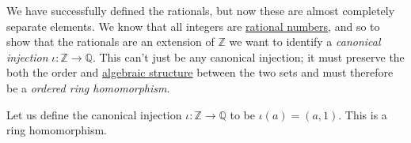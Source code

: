   We have successfully defined the rationals, but now these are almost completely separate elements. We know that all integers are \hyperref[alg-def:rational-numbers]{rational numbers}, and so to show that the rationals are an extension of $\mathbb{Z}$ we want to identify a \textit{canonical injection} $\iota: \mathbb{Z} \rightarrow \mathbb{Q}$. This can't just be any canonical injection; it must preserve the both the order and \hyperref[alg-def:algebraic-structure]{algebraic structure} between the two sets and must therefore be a \textit{ordered ring homomorphism}. 

  \begin{theorem}
    \label{thm:canonical-injection-of-z-to-q-is-an-ordered}
    Let us define the canonical injection $\iota: \mathbb{Z} \rightarrow \mathbb{Q}$ to be $\iota(a) = (a, 1)$. This is a ring homomorphism. 
  \end{theorem}
